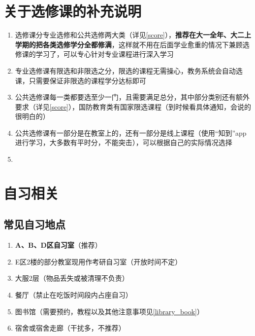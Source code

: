 \section[关于选修课的补充说明]{关于选修课的补充说明}
\begin{enumerate}
    \item 选修课分专业选修和公共选修两大类（详见\uline{\ref{score}}），\textbf{推荐在大一全年、大二上学期的把各类选修学分全都修满}，这样就不用在后面学业愈重的情况下兼顾选修课的学习了，可以专心针对专业课程进行深入学习
    \item 专业选修课有限选和非限选之分，限选的课程无需操心，教务系统会自动选课，只需要保证非限选的课程学分达标即可
    \item 公共选修课每一类都要选至少一门，且需要满足总分，其中部分类别还有额外要求（详见\uline{\ref{score}}），国防教育类有国家限选课程（到时候看具体通知，会说的很明白的）
    \item 公共选修课有一部分是在教室上的，还有一部分是线上课程（使用“知到”app进行学习，大多数有平时分，不能突击），可以根据自己的实际情况选择\footnotemark
    \item \textbf{}
\end{enumerate}

\section[自习相关]{自习相关}
\subsection[常见自习地点]{常见自习地点}
\begin{enumerate}
    \item \textbf{A、B、D区自习室}（推荐）
    \item E区2楼的部分教室现用作考研自习室（开放时间不定）
    \item 大服2层（物品丢失或被清理不负责）
    \item 餐厅（禁止在吃饭时间段内占座自习）
    \item 图书馆（需要预约，教程以及其他注意事项见\uline{\ref{library_book}}）
    \item 宿舍或宿舍走廊（干扰多，不推荐）
\end{enumerate}
